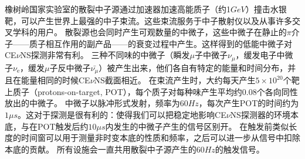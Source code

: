 \begin{translation}
橡树岭国家实验室的散裂中子源通过加速器加速高能质子（约1$\si{GeV}$）撞击水银靶，可以产生世界上最强的中子束流。这些束流服务于中子散射仪以及从事许多交叉学科的用户。
散裂源也会同时产生可观数量的中微子，这些中微子在静止的$\pi$介子——质子相互作用的副产品——的衰变过程中产生。这样得到的低能中微子对CE$\nu$NS探测非常有利。
三种不同味的中微子（瞬发$\mu$子中微子$\nu_\mu$，缓发电子中微子$\nu_\mathrm{e}$，缓发$\mu$子反中微子$\bar{\nu_\mu}$）被产生出来，他们各自有特定的能量和时间分布，并且在能量相同的时候CE$\nu$NS截面相近。
在束流产生时，大约每天产生$5\times10^{20}$个靶上质子（protons-on-target, POT），每个质子对每种味产生平均约0.08个各向同性放出的中微子。
中微子以脉冲形式发射，频率为$60\si{Hz}$，每次产生POT的时间约为$1\si{\mu s}$。这对于探测是很有利的：使得我们可以把稳定地影响CE$\nu$NS探测器的环境本底，与在POT触发后约$10\si{\mu s}$内发生的中微子产生的信号区别开。
在触发前类似长度的时间窗可以用于测量非时变本底的性质和频率，之后可以进一步从信号中扣除本底的贡献。
所有设施会一直共用散裂中子源产生的$60\si{Hz}$的触发信号。




\begin{translation-index}
  \nocite{akimov_observation_2017}
  
  
\end{translation-index}

\end{translation}
